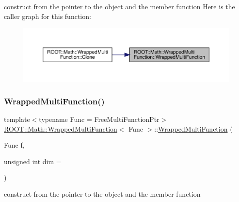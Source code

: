 construct from the pointer to the object and the member function Here is the caller graph for this function\+:\nopagebreak
\begin{figure}[H]
\begin{center}
\leavevmode
\includegraphics[width=350pt]{de/da4/classROOT_1_1Math_1_1WrappedMultiFunction_a015f33dec6c241c6b5662df06ea4ddb9_icgraph}
\end{center}
\end{figure}
\mbox{\label{classROOT_1_1Math_1_1WrappedMultiFunction_a015f33dec6c241c6b5662df06ea4ddb9}} 
\subsubsection{\texorpdfstring{WrappedMultiFunction()}{WrappedMultiFunction()}\hspace{0.1cm}{\footnotesize\ttfamily [2/3]}}
{\footnotesize\ttfamily template$<$typename Func  = Free\+Multi\+Function\+Ptr$>$ \\
\mbox{\hyperlink{classROOT_1_1Math_1_1WrappedMultiFunction}{R\+O\+O\+T\+::\+Math\+::\+Wrapped\+Multi\+Function}}$<$ Func $>$\+::\mbox{\hyperlink{classROOT_1_1Math_1_1WrappedMultiFunction}{Wrapped\+Multi\+Function}} (\begin{DoxyParamCaption}\item[{Func}]{f,  }\item[{unsigned int}]{dim = {} }\end{DoxyParamCaption})\hspace{0.3cm}{\ttfamily [inline]}}

construct from the pointer to the object and the member function \mbox{\label{classROOT_1_1Math_1_1WrappedMultiFunction_a015f33dec6c241c6b5662df06ea4ddb9}} 
